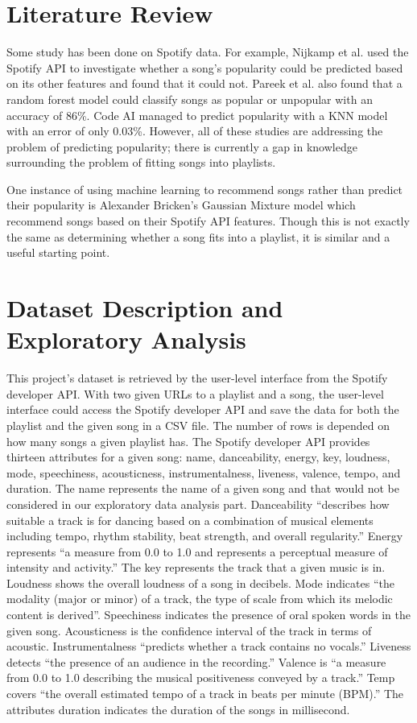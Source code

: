 \documentclass[titlepage]{article}
\begin{document}
\section{Literature Review}
Some study has been done on Spotify data. For example, Nijkamp et al. used the Spotify API
to investigate whether a song's popularity could be predicted based on its other features and found
that it could not. Pareek et al. also found that a random forest model could classify songs
as popular or unpopular with an accuracy of 86\%. Code AI managed to predict popularity with a KNN
model with an error of only 0.03\%. However, all of these studies are addressing the problem
of predicting popularity; there is currently a gap in knowledge surrounding the problem of fitting
songs into playlists. 

One instance of using machine learning to recommend songs rather than predict their popularity is
Alexander Bricken's Gaussian Mixture model which recommend songs based on their Spotify API
features. Though this is not exactly the same as determining whether a song fits into a playlist,
it is similar and a useful starting point.

\section{Dataset Description and Exploratory Analysis}
This project’s dataset is retrieved by the user-level interface from the Spotify developer API. With two given URLs to a playlist and a song, the user-level interface could access the Spotify developer API and save the data for both the playlist and the given song in a CSV file. The number of rows is depended on how many songs a given playlist has. The Spotify developer API provides thirteen attributes for a given song: name, danceability, energy, key, loudness, mode, speechiness, acousticness, instrumentalness, liveness, valence, tempo, and duration. The name represents the name of a given song and that would not be considered in our exploratory data analysis part. Danceability “describes how suitable a track is for dancing based on a combination of musical elements including tempo, rhythm stability, beat strength, and overall regularity.” Energy represents “a measure from 0.0 to 1.0 and represents a perceptual measure of intensity and activity.” The key represents the track that a given music is in. Loudness shows the overall loudness of a song in decibels.  Mode indicates “the modality (major or minor) of a track, the type of scale from which its melodic content is derived”. Speechiness indicates the presence of oral spoken words in the given song. Acousticness is the confidence interval of the track in terms of acoustic. Instrumentalness “predicts whether a track contains no vocals.” Liveness detects “the presence of an audience in the recording.” Valence is “a measure from 0.0 to 1.0 describing the musical positiveness conveyed by a track.” Temp covers “the overall estimated tempo of a track in beats per minute (BPM).” The attributes duration indicates the duration of the songs in millisecond. 
\end{document}
